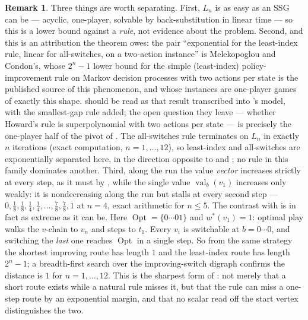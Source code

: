 \documentclass[11pt]{article}
\theoremstyle{plain}
\theoremstyle{definition}
\newtheorem{remark}[theorem]{Remark}
\DeclareMathOperator{\val}{val}
\DeclareMathOperator{\Opt}{Opt}
\begin{document}
\begin{remark}\label{rem:ladder}
Three things are worth separating. First, $L_n$ is as easy as an SSG can
be --- acyclic, one-player, solvable by back-substitution in linear time
--- so this is a lower bound against a \emph{rule}, not evidence about the
problem. Second, and this is an attribution the theorem owes: the pair
``exponential for the least-index rule, linear for all-switches, on a
two-action instance'' is Melekopoglou and Condon's, whose $2^{n}-1$ lower
bound for the simple (least-index) policy-improvement rule on Markov
decision processes with two actions per state is the published source of
this phenomenon, and whose instances are one-player games of exactly this
shape.  should be read as that result transcribed into
's model, with the smallest-gap rule added; the open
question they leave --- whether Howard's rule is superpolynomial with two
actions per state --- is precisely the one-player half of the pivot of
. The all-switches rule terminates on $L_n$ in exactly $n$
iterations (exact computation, $n=1,\dots,12$), so least-index and
all-switches are exponentially separated here, in the direction opposite
to  and ;
no rule in this family dominates another. Third, along the run the value
\emph{vector} increases strictly at every step, as it must by
, while the single value $\val_b(v_1)$ increases only weakly: it is
nondecreasing along the run but stalls at every second step ---
$0,\tfrac18,\tfrac18,\tfrac14,\tfrac14,\dots,\tfrac78,\tfrac78,1$ at
$n=4$, exact arithmetic for $n\le5$. The contrast with  is in fact
as extreme as it can be. Here $\Opt=\{0\cdots01\}$ and
$w^\ast(v_1)=1$: optimal play walks the $v$-chain to $v_n$ and steps to
$t_1$. Every $v_i$ is switchable at $b=0\cdots0$, and switching the
\emph{last} one reaches $\Opt$ in a single step. So from the same
strategy the shortest improving route has length $1$ and the least-index
route has length $2^{n}-1$; a breadth-first search over the improving-switch
digraph confirms the distance is $1$ for $n=1,\dots,12$. This is the
sharpest form of : not merely that a short route
exists while a natural rule misses it, but that the rule can miss a
one-step route by an exponential margin, and that no scalar read off the
start vertex distinguishes the two.
\end{remark}
\end{document}
